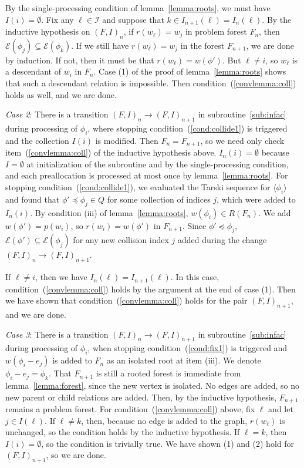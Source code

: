 \documentclass[11pt,reqno]{amsart}
\theoremstyle{definition}
\numberwithin{equation}{section}
\newcommand{\lag}{\langle}
\newcommand{\rag}{\rangle}
\newcommand{\pre}{\phi}
\newcommand{\sub}{\subseteq}
\newcommand{\fix}{\mathcal{E}}
\newcommand{\peq}{\preceq}
\newcommand{\act}{Q}
\newcommand{\coll}{I}
\newcommand{\forest}{F}
\newcommand{\pair}{(F,I)}
\newcommand{\roott}{R}
\newcommand{\infacstoptwiii}{(iii)\xspace}
\begin{document}
By the single-processing condition of lemma~\ref{lemma:roots}, we must have $\coll(i) = \emptyset$.
Fix any $\ell \in \mathcal{I}$ and suppose that $k \in \coll_{n+1}(\ell) = \coll_{n}(\ell)$. 
By the inductive hypothesis on $\pair_n$, if $r(w_{\ell}) = w_j$ in problem forest $\forest_n$, then $\fix(\pre_j) \sub \fix(\pre_k)$. 
If we still have $r(w_{\ell}) = w_j$ in the forest $\forest_{n+1}$, we are done by induction. 
If not, then it must be that $r(w_{\ell}) = w(\pre')$. 
But $\ell \not = i$, so $w_{\ell}$ is a descendant of $w_i$ in $\forest_n$.
Case (1) of the proof of lemma~\ref{lemma:roots} shows that such a descendant relation is impossible. 
Then condition~(\ref{convlemma:coll}) holds as well, and we are done.

\emph{Case 2}: There is a transition $\pair_n \to \pair_{n +1}$ in subroutine~\ref{sub:infac} during processing of $\pre_i$, where stopping condition~(\ref{cond:collide1}) is triggered and the collection $\coll(i)$ is modified.
Then $\forest_n = \forest_{n + 1}$, so we need only check item~(\ref{convlemma:coll}) of the inductive hypothesis above.
$\coll_n(i) = \emptyset$ because $I = \emptyset$ at initialization of the subroutine and by the single-processing condition, and each preallocation is processed at most once by lemma~\ref{lemma:roots}. %
For stopping condition~(\ref{cond:collide1}), we evaluated the Tarski sequence for $\lag \pre_i \rag$ and found that $\pre' \peq \pre_j \in \act$ for some collection of indices $j$, which were added to $I_n(i)$.
By condition (iii) of lemma~\ref{lemma:roots}, $w(\pre_i) \in \roott(\forest_n)$. 
We add $w(\pre') = p(w_i)$, so $r(w_i) = w(\pre')$ in $\forest_{n+1}$. 
Since $\pre' \peq \pre_j$, $\fix(\pre') \sub \fix(\pre_j)$ for any new collision index $j$ added during the change $\pair_n \to \pair_{n+1}$.

If $\ell \not = i$, then we have $\coll_n(\ell) = \coll_{n + 1}(\ell)$. 
In this case, condition~(\ref{convlemma:coll}) holds by the argument at the end of case (1).
Then we have shown that condition~(\ref{convlemma:coll}) holds for the pair $\pair_{n + 1}$, and we are done. 

\emph{Case 3}: There is a transition $\pair_n \to \pair_{n +1}$ in subroutine~\ref{sub:infac} during processing of $\pre_i$, when stopping condition~(\ref{cond:fix1}) is triggered and $w(\pre_i - e_j)$ is added to $\forest_n$ as an isolated root at item \infacstoptwiii. 
We denote $\pre_i - e_j = \pre_k$.
That $\forest_{n + 1}$ is still a rooted forest is immediate from lemma~\ref{lemma:forest}, since the new vertex is isolated.
No edges are added, so no new parent or child relations are added. 
Then, by the inductive hypothesis, $\forest_{n + 1}$ remains a problem forest.
For condition~(\ref{convlemma:coll}) above, fix $\ell$ and let $j \in \coll(\ell)$.
If $\ell \not = k$, then, because no edge is added to the graph, $r(w_{\ell})$ is unchanged, so the condition holds by the inductive hypothesis. 
If $\ell = k$, then $\coll(i) = \emptyset$, so the condition is trivially true. 
We have shown (1) and (2) hold for $\pair_{n + 1}$, so we are done.
\end{document}
